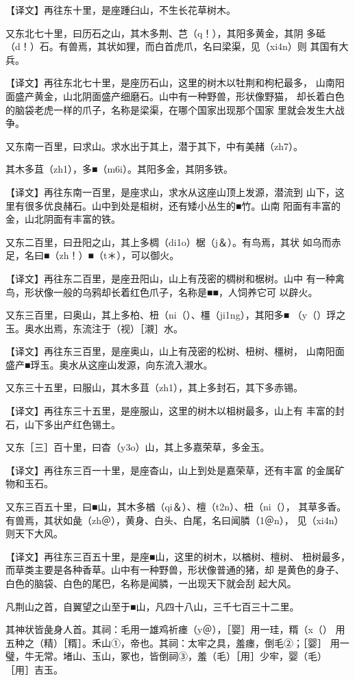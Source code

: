 \documentclass[a4paper,12pt,UTF8,twoside]{ctexbook}
\begin{document}
【译文】再往东十里，是座踵臼山，不生长花草树木。

又东北七十里，曰历石之山，其木多荆、芑（q！），其阳多黄金，其阴 多砥（d！）石。有兽焉，其状如狸，而白首虎爪，名曰梁渠，见（xi4n）则 其国有大兵。

【译文】再往东北七十里，是座历石山，这里的树木以牡荆和枸杞最多， 山南阳面盛产黄金，山北阴面盛产细磨石。山中有一种野兽，形状像野猫， 却长着白色的脑袋老虎一样的爪子，名称是梁渠，在哪个国家出现那个国家 里就会发生大战争。

又东南一百里，曰求山。求水出于其上，潜于其下，中有美赭（zh7）。

其木多苴（zh1），多■（m6i）。其阳多金，其阴多铁。

【译文】再往东南一百里，是座求山，求水从这座山顶上发源，潜流到 山下，这里有很多优良赭石。山中到处是柤树，还有矮小丛生的■竹。山南 阳面有丰富的金，山北阴面有丰富的铁。

又东二百里，曰丑阳之山，其上多椆（di1o）椐（j＆）。有鸟焉，其状 如乌而赤足，名曰■（zh！）■（t＊），可以御火。

【译文】再往东二百里，是座丑阳山，山上有茂密的椆树和椐树。山中 有一种禽鸟，形状像一般的乌鸦却长着红色爪子，名称是■■，人饲养它可 以辟火。

又东三百里，曰奥山，其上多柏、杻（ni（）、橿（ji1ng），其阳多■ （y（）琈之玉。奥水出焉，东流注于（视）［瀙］水。

【译文】再往东三百里，是座奥山，山上有茂密的松树、杻树、橿树， 山南阳面盛产■琈玉。奥水从这座山发源，向东流入瀙水。

又东三十五里，曰服山，其木多苴（zh1），其上多封石，其下多赤锡。

【译文】再往东三十五里，是座服山，这里的树木以柤树最多，山上有 丰富的封石，山下多出产红色锡土。

又东［三］百十里，曰杳（y3o）山，其上多嘉荣草，多金玉。

【译文】再往东三百一十里，是座杳山，山上到处是嘉荣草，还有丰富 的金属矿物和玉石。

又东三百五十里，曰■山，其木多楢（qi＆）、檀（t2n）、杻（ni（）， 其草多香。有兽焉，其状如彘（zh＠），黄身、白头、白尾，名曰闻膦（1＠n）， 见（xi4n）则天下大风。

【译文】再往东三百五十里，是座■山，这里的树木，以楢树、檀树、 杻树最多，而草类主要是各种香草。山中有一种野兽，形状像普通的猪，却 是黄色的身子、白色的脑袋、白色的尾巴，名称是闻膦，一出现天下就会刮 起大风。

凡荆山之首，自翼望之山至于■山，凡四十八山，三千七百三十二里。

其神状皆彘身人首。其祠：毛用一雄鸡祈瘗（y＠），［婴］用一珪，糈（x（） 用五种之（精）［糈］。禾山①，帝也。其祠：太牢之具，羞瘗，倒毛②；［婴］ 用一璧，牛无常。堵山、玉山，冢也，皆倒祠③，羞（毛）［用］少牢，婴（毛） ［用］吉玉。
\end{document}
